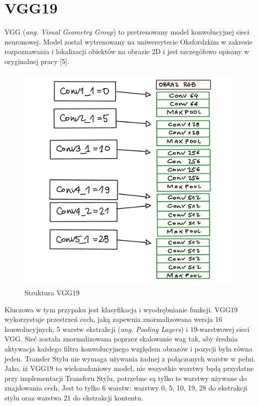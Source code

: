 \documentclass[openright]{xmgr}
\begin{document}
\section{VGG19\label{s:dsssl}}

  \indent \indent VGG (\textit{ang. Visual Geometry Group}) to pretrenowany model konwolucyjnej sieci neuronowej. 
Model został wytrenowany na uniwersytecie Oksfordzkim w zakresie rozpoznawania i lokalizacji obiektów na obrazie 2D i jest szczegółowo opisany w oryginalnej pracy [5].

\begin{figure}[!tbh]
\centering
\includegraphics[width=.8\hsize]{fig/7}
\caption{Struktura VGG19\label{RYS.4}}
\end{figure}


Kluczowa w tym przypaku jest klasyfikacja i wyodrębnianie funkcji.
VGG19 wykorzystuje przestrzeń cech, jaką zapewnia znormalizowana wersja 16 konwolucyjnych, 5 warstw ekstrakcji (\textit{ang. Pooling Layers}) i 19-warstwowej sieci VGG. Sieć została znormalizowana poprzez skalowanie wag tak, aby średnia aktywacja każdego filtra konwolucyjnego względem obrazów i pozycji była równa jeden. Transfer Stylu nie wymaga używania żadnej z połączonych warstw w pełni. Jako, iż VGG19 to wielozadaniowy model, nie wszystkie warstwy będą przydatne przy implementacji Transferu Stylu, potrzebne są tylko te warstwy używane do znajdowania cech. Jest to tylko 6 warstw: warstwy 0, 5, 10, 19, 28 do ekstrakcji stylu oraz warstwa 21 do ekstrakcji kontentu.
\end{document}
